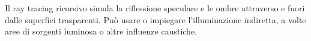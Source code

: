\documentclass[9pt,a4paper,twoside]{tau}
\begin{document}
Il ray tracing ricorsivo simula la riflessione speculare e le ombre attraverso e fuori dalle superfici trasparenti. Può usare o impiegare l'illuminazione indiretta, a volte aree di sorgenti luminosa o altre influenze caustiche.
%
%
%
%    
%
%    
%    
%
%
%
%        
%
%
%		
%
%
\end{document}
